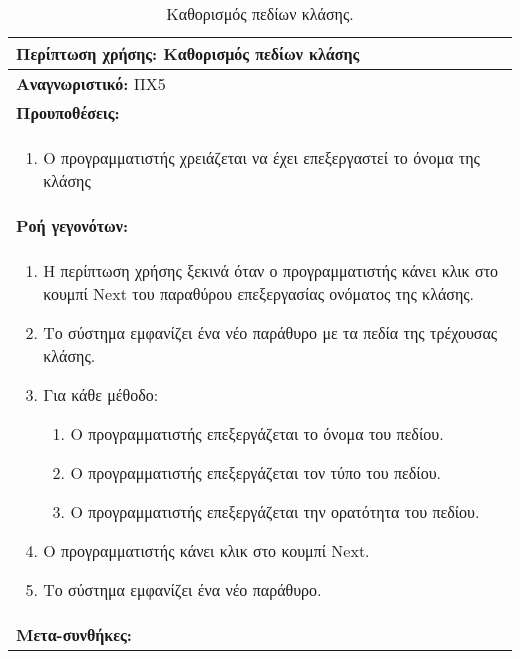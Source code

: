 \begin{table}[H]
	\hspace*{-0.2cm}
    \centering
    \scriptsize
	\begin{tabular}{|p{10cm}|}
	\hline
		\textbf{Περίπτωση χρήσης:} Καθορισμός πεδίων κλάσης \\
	\hline
		\textbf{Αναγνωριστικό:} ΠΧ5 \\
	\hline	
		\textbf{Προυποθέσεις:} \\
		\begin{enumerate}
		 \item Ο προγραμματιστής χρειάζεται να έχει επεξεργαστεί το όνομα της κλάσης
		\end{enumerate} \\
	\hline
		\textbf{Ροή γεγονότων:} \\
		\begin{enumerate}
		 \item Η περίπτωση χρήσης ξεκινά όταν ο προγραμματιστής κάνει κλικ στο κουμπί Next του παραθύρου επεξεργασίας ονόματος της κλάσης.
		 \item Το σύστημα εμφανίζει ένα νέο παράθυρο με τα πεδία της τρέχουσας κλάσης.
		 \item Για κάθε μέθοδο:\begin{enumerate}
						 		 \item Ο προγραμματιστής επεξεργάζεται το όνομα του πεδίου.
								 \item Ο προγραμματιστής επεξεργάζεται τον τύπο του πεδίου.
		 						 \item Ο προγραμματιστής επεξεργάζεται την ορατότητα του πεδίου.
			 		 		  \end{enumerate}
 		 \item Ο προγραμματιστής κάνει κλικ στο κουμπί Next.
 		 \item Το σύστημα εμφανίζει ένα νέο παράθυρο.
		\end{enumerate} \\
	\hline
		\textbf{Μετα-συνθήκες:} \\
	\hline
    \end{tabular}
    \caption{Καθορισμός πεδίων κλάσης.}
    \label{tab:setClassFieldsUC}
\end{table}
